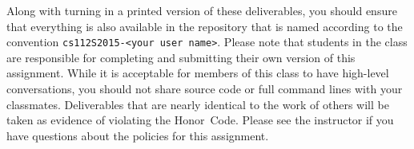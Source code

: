 Along with turning in a printed version of these deliverables, you should ensure that everything is also available in
the repository that is named according to the convention {\tt cs112S2015-<your user name>}. Please note that students
in the class are responsible for completing and submitting their own version of this assignment.    While it is
acceptable for members of this class to have high-level conversations, you should not share source code or full
command lines with your classmates.  Deliverables that are nearly identical to the work of others will be taken as
evidence of violating the \mbox{Honor Code}.  Please see the instructor if you have questions about the policies for
this assignment.


